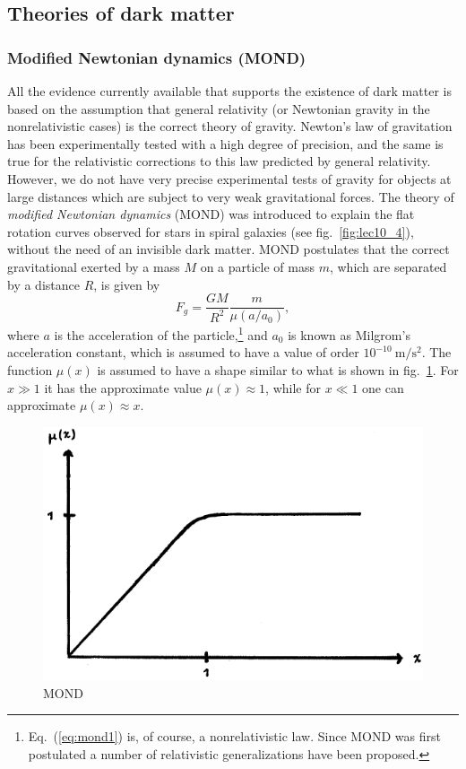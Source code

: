 \subsection{Theories of dark matter}

\subsubsection{Modified Newtonian dynamics (MOND)}

All the evidence currently available that supports the existence of dark matter is based on the assumption that general relativity (or Newtonian gravity in the nonrelativistic cases) is the correct theory of gravity. Newton's law of gravitation has been experimentally tested with a high degree of precision, and the same is true for the relativistic corrections to this law predicted by general relativity. However, we do not have very precise experimental tests of gravity for objects at large distances which are subject to very weak gravitational forces. The theory of {\it modified Newtonian dynamics} (MOND) was introduced to explain the flat rotation curves observed for stars in spiral galaxies (see fig.\ \ref{fig:lec10_4}), without the need of an invisible dark matter. MOND postulates that the correct gravitational exerted by a mass $M$ on a particle of mass $m$, which are separated by a distance $R$, is given by
\begin{equation} \label{eq:mond1}
F_g=\frac{GM}{R^2}\frac{m}{\mu(a/a_0)},
\end{equation}
where $a$ is the acceleration of the particle,\footnote{Eq.\ (\ref{eq:mond1}) is, of course, a nonrelativistic law. Since MOND was first postulated a number of relativistic generalizations have been proposed.} and $a_0$ is known as Milgrom's acceleration constant, which is assumed to have a value of order $10^{-10}~\mathrm{m/s^2}$. The function $\mu(x)$ is assumed to have a shape similar to what is shown in fig.\ \ref{fig:lec10_9}. For $x\gg1$ it has the approximate value $\mu(x)\approx1$, while for $x\ll1$ one can approximate $\mu(x)\approx x$.
\begin{figure}[ht]
\begin{center}
\includegraphics[scale=0.6]{Draw/lec10_9.png}
\end{center}
\caption{MOND}
\label{fig:lec10_9}
\end{figure}

